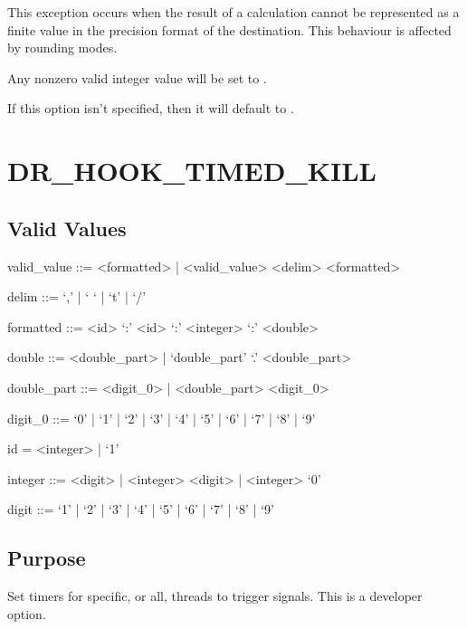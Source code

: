 \documentclass[letterpaper,10pt,english]{sphinxmanual}
\begin{document}
\sphinxAtStartPar
This exception occurs when the result of a calculation cannot be represented as a finite value in the precision format of the destination. This behaviour is affected by rounding modes.

\sphinxAtStartPar
Any non\sphinxhyphen{}zero valid integer value will be set to .

\sphinxAtStartPar
If this option isn’t specified, then it will default to .


\section{DR\_HOOK\_TIMED\_KILL}
\label{\detokenize{flag/flag:dr-hook-timed-kill}}\label{\detokenize{flag/flag:id179}}

\subsection{Valid Values}
\label{\detokenize{flag/flag:id180}}
\begin{DUlineblock}{0em}
\item[] valid\_value ::= \textless{}formatted\textgreater{} |  \textless{}valid\_value\textgreater{} \textless{}delim\textgreater{} \textless{}formatted\textgreater{}
\item[] delim ::= ‘,’ | ‘ ‘ | ‘t’ | ‘/’
\item[] formatted ::= \textless{}id\textgreater{} ‘:’ \textless{}id\textgreater{} ‘:’ \textless{}integer\textgreater{} ‘:’ \textless{}double\textgreater{}
\item[] double ::= \textless{}double\_part\textgreater{} | ‘double\_part’ ‘.’ \textless{}double\_part\textgreater{}
\item[] double\_part ::= \textless{}digit\_0\textgreater{} | \textless{}double\_part\textgreater{} \textless{}digit\_0\textgreater{}
\item[] digit\_0 ::= ‘0’ | ‘1’ | ‘2’ | ‘3’ | ‘4’ | ‘5’ | ‘6’ | ‘7’ | ‘8’ | ‘9’
\item[] id = \textless{}integer\textgreater{} | ‘\sphinxhyphen{}1’
\item[] integer ::= \textless{}digit\textgreater{} | \textless{}integer\textgreater{} \textless{}digit\textgreater{} | \textless{}integer\textgreater{} ‘0’
\item[] digit ::= ‘1’ | ‘2’ | ‘3’ | ‘4’ | ‘5’ | ‘6’ | ‘7’ | ‘8’ | ‘9’
\end{DUlineblock}


\subsection{Purpose}
\label{\detokenize{flag/flag:id181}}
\sphinxAtStartPar
Set timers for specific, or all, threads to trigger signals. This is a developer option.
\end{document}
